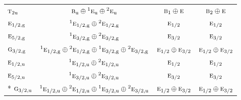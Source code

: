 \documentclass[10pt,a4paper]{article}
\numberwithin{equation}{section}
\newcommand{\irr}[1]{\text{\normalfont\scshape #1}}
\newcommand{\conjpair}[1]{{}^{#1}}
\newcommand{\ptag}[1]{\mathrm{#1}}
\begin{document}
{\begin{longtable}{@{}lccc@{}}
$\irr{t}_{2\ptag{u}}$ & $\irr{b}_{\ptag{u}}\oplus \conjpair{1}\irr{e}_{\ptag{u}}\oplus \conjpair{2}\irr{e}_{\ptag{u}}$ & $\irr{b}_{1}\oplus \irr{e}$ & $\irr{b}_{2}\oplus \irr{e}$\\
$\irr{e}_{1/2,\ptag{g}}$ & $\conjpair{1}\irr{e}_{1/2,\ptag{g}}\oplus \conjpair{2}\irr{e}_{1/2,\ptag{g}}$ & $\irr{e}_{1/2}$ & $\irr{e}_{1/2}$\\
$\irr{e}_{5/2,\ptag{g}}$ & $\conjpair{1}\irr{e}_{3/2,\ptag{g}}\oplus \conjpair{2}\irr{e}_{3/2,\ptag{g}}$ & $\irr{e}_{3/2}$ & $\irr{e}_{3/2}$\\
$\irr{g}_{3/2,\ptag{g}}$ & $\conjpair{1}\irr{e}_{1/2,\ptag{g}}\oplus \conjpair{2}\irr{e}_{1/2,\ptag{g}}\oplus \conjpair{1}\irr{e}_{3/2,\ptag{g}}\oplus \conjpair{2}\irr{e}_{3/2,\ptag{g}}$ & $\irr{e}_{1/2}\oplus \irr{e}_{3/2}$ & $\irr{e}_{1/2}\oplus \irr{e}_{3/2}$\\
$\irr{e}_{1/2,\ptag{u}}$ & $\conjpair{1}\irr{e}_{1/2,\ptag{u}}\oplus \conjpair{2}\irr{e}_{1/2,\ptag{u}}$ & $\irr{e}_{1/2}$ & $\irr{e}_{1/2}$\\
$\irr{e}_{5/2,\ptag{u}}$ & $\conjpair{1}\irr{e}_{3/2,\ptag{u}}\oplus \conjpair{2}\irr{e}_{3/2,\ptag{u}}$ & $\irr{e}_{3/2}$ & $\irr{e}_{3/2}$\\*
$\irr{g}_{3/2,\ptag{u}}$ & $\conjpair{1}\irr{e}_{1/2,\ptag{u}}\oplus \conjpair{2}\irr{e}_{1/2,\ptag{u}}\oplus \conjpair{1}\irr{e}_{3/2,\ptag{u}}\oplus \conjpair{2}\irr{e}_{3/2,\ptag{u}}$ & $\irr{e}_{1/2}\oplus \irr{e}_{3/2}$ & $\irr{e}_{1/2}\oplus \irr{e}_{3/2}$\\
\bottomrule\end{longtable}}
\end{document}
